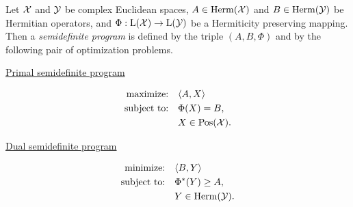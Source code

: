 Let $\mathcal{X}$ and $\mathcal{Y}$ be complex Euclidean spaces, $A\in\mathrm{Herm}(\mathcal{X})$ and $B\in\mathrm{Herm}(\mathcal{Y})$
be Hermitian operators, and $\Phi:\mathrm{L}(\mathcal{X})\to\mathrm{L}(\mathcal{Y})$ be a Hermiticity preserving mapping.
Then a \emph{semidefinite program} is defined by the triple $(A,B,\Phi)$ and by 
the following pair of optimization problems.
\begin{center}
  \begin{minipage}{2in}
    \centerline{\underline{Primal semidefinite program}}\vspace{-7mm}
    \begin{align*}
      \text{maximize:}\quad & \langle A , X\rangle\\
      \text{subject to:}\quad & \Phi(X) = B,\\
      & X \in \mathrm{Pos}(\mathcal{X}).
    \end{align*}
  \end{minipage}
  \hspace*{1.5cm}
  \begin{minipage}{2.4in}
    \centerline{\underline{Dual semidefinite program}}\vspace{-7mm}
    \begin{align*}
      \text{minimize:}\quad & \langle B , Y\rangle\\
      \text{subject to:}\quad & \Phi^{\ast}(Y) \geq A,\\
      & Y\in\mathrm{Herm}(\mathcal{Y}).
    \end{align*}
  \end{minipage}
\end{center}

